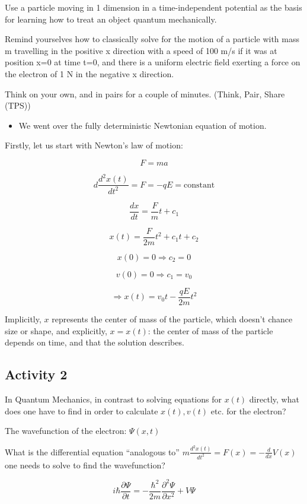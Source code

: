 \documentclass{article}
\begin{document}
Use a particle moving in 1 dimension in a time-independent potential as the basis for learning how to treat an object quantum mechanically. 

Remind yourselves how to classically solve for the motion of a particle with mass m travelling in the positive x direction with a speed of 100 m/s if it was at position x=0 at time t=0, and there is a uniform electric field exerting a force on the electron of 1 N in the negative x direction.

Think on your own, and in pairs for a couple of minutes. (Think, Pair, Share (TPS))

\begin{itemize}
    \item We went over the fully deterministic Newtonian equation of motion.
\end{itemize}

Firstly, let us start with Newton's law of motion:

$$F = ma$$

$$d \frac{d^2 x(t)}{dt^2} = F = -qE = \text{constant}$$

$$\frac{dx}{dt} = \frac{F}{m} t + c_1$$

$$x(t) = \frac{F}{2m} t^2 + c_1 t + c_2$$

$$x(0) = 0 \Rightarrow c_2 = 0$$

$$v(0) = 0 \Rightarrow c_1 = v_0$$

$$\Rightarrow x(t) = v_0 t - \frac{qE}{2m} t^2$$

Implicitly, $x$ represents the center of mass of the particle, which doesn't chance size or shape, and explicitly, $x = x(t)$: the center of mass of the particle depends on time, and that the solution describes. 

\subsection{Activity 2}

In Quantum Mechanics, in contrast to solving equations for $x(t)$ directly, what does one have to find in order to calculate $x(t), v(t)$ etc. for the electron?  

The wavefunction of the electron: $\Psi(x,t)$

What is the differential equation “analogous to” $m \frac{d^2 x(t)}{dt^2} = F(x) = -\frac{d}{dx} V(x)$ one needs to solve to find the wavefunction?

$$i \hbar \frac{\partial \Psi}{\partial t} = - \frac{\hbar^2}{2m} \frac{\partial^2 \Psi}{\partial x^2} + V \Psi$$
\end{document}
